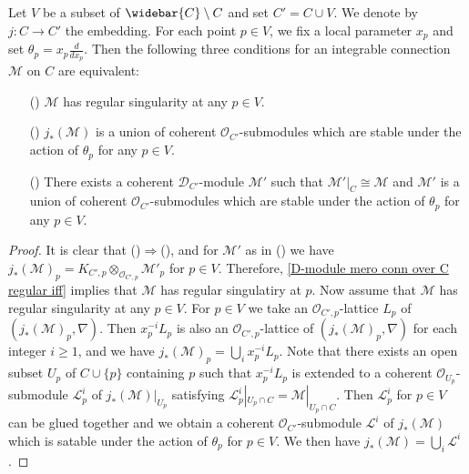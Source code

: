 \begin{proposition}\label{D-module integral connection on curve regular at open subset iff}
Let $V$ be a subset of $\widebar{C}\setminus C$ and set $C'=C\cup V$. We denote by $j:C\to C'$ the embedding. For each point $p\in V$, we fix a local parameter $x_p$ and set $\theta_p=x_p\frac{d}{dx_p}$. Then the following three conditions for an integrable connection $\mathscr{M}$ on $C$ are equivalent:
\begin{enumerate}
    \item[(\rmnum{1})] $\mathscr{M}$ has regular singularity at any $p\in V$.
    \item[(\rmnum{2})] $j_*(\mathscr{M})$ is a union of coherent $\mathscr{O}_{C'}$-submodules which are stable under the action of $\theta_p$ for any $p\in V$.
    \item[(\rmnum{3})] There exists a coherent $\mathscr{D}_{C'}$-module $\mathscr{M}'$ such that $\mathscr{M}'|_C\cong\mathscr{M}$ and $\mathscr{M}'$ is a union of coherent $\mathscr{O}_{C'}$-submodules which are stable under the action of $\theta_p$ for any $p\in V$.
\end{enumerate}
\end{proposition}
\begin{proof}
It is clear that ()$\Rightarrow$(), and for $\mathscr{M}'$ as in () we have $j_*(\mathscr{M})_p=K_{C',p}\otimes_{\mathscr{O}_{C',p}}\mathscr{M}'_p$ for $p\in V$. Therefore, \cref{D-module mero conn over C regular iff} implies that $\mathscr{M}$ has regular singulatiry at $p$. Now assume that $\mathscr{M}$ has regular singularity at any $p\in V$. For $p\in V$ we take an $\mathscr{O}_{C',p}$-lattice $L_p$ of $(j_*(\mathscr{M})_p,\nabla)$. Then $x_p^{-i}L_p$ is also an $\mathscr{O}_{C',p}$-lattice of $(j_*(\mathscr{M})_p,\nabla)$ for each integer $i\geq 1$, and we have $j_*(\mathscr{M})_p=\bigcup_ix_p^{-i}L_p$. Note that there exists an open subset $U_p$ of $C\cup\{p\}$ containing $p$ such that $x_p^{-i}L_p$ is extended to a coherent $\mathscr{O}_{U_p}$-submodule $\mathscr{L}_p^i$ of $j_*(\mathscr{M})|_{U_p}$ satisfying $\mathscr{L}_p^i|_{U_p\cap C}=\mathscr{M}|_{U_p\cap C}$. Then $\mathscr{L}_p^i$ for $p\in V$ can be glued together and we obtain a coherent $\mathscr{O}_{C'}$-submodule $\mathscr{L}^i$ of $j_*(\mathscr{M})$ which is satable under the action of $\theta_p$ for $p\in V$. We then have $j_*(\mathscr{M})=\bigcup_i\mathscr{L}^i$.
\end{proof}

